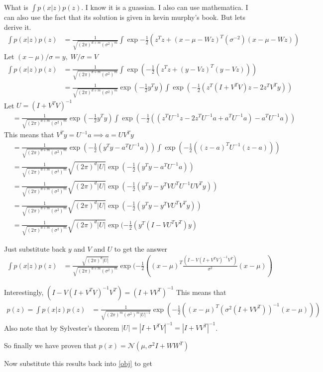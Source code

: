 \documentclass[11pt]{article}
\renewcommand{\det}[1]{|#1|}
\newcommand{\mf}{-\frac{1}{2}}
\newcommand{\fc}{\frac{1}{\sqrt{(2\pi)^{d+m}(\sigma^2)^m }}}
\begin{document}
What is $\int p(x|z) p(z)$. I know it is a guassian. I also can use
mathematica. I can also use the fact that its solution is given in
kevin murphy's book. But lets derive it.
\begin{align}
  \int p(x|z)p(z) &= \fc \int
  \exp{\mf (z^Tz + (x-\mu - Wz)^T(\sigma^{-2})(x-\mu-Wz))}
\end{align}
Let $(x-\mu)/\sigma = y,\; W/\sigma=V$
\begin{align}
  \int p(x|z)p(z) &= \fc \int \exp(\mf (z^Tz + (y - Vz)^T(y-Vz)))\\
  &= \fc\exp(\mf y^Ty) \int \exp(\mf (z^T (I+V^TV) z  - 2z^TV^Ty))
\end{align}
Let $U = (I+V^TV)^{-1}$
\begin{align}
  &= \fc \exp(\mf y^Ty) \int \exp(\mf ( \left(z^TU^{-1}z -2z^TU^{-1}a + a^TU^{-1}a\right) - a^TU^{-1}a  ))
\end{align}
This means that $V^Ty = U^{-1}a \implies a = UV^Ty$
\begin{align}
  &= \fc \exp(\mf (y^Ty - a^TU^{-1}a) ) \int \exp(\mf ((z-a)^T U^{-1}(z-a)))\\
  &= \fc \sqrt{(2\pi)^d \det{U}} \exp(\mf (y^Ty - a^TU^{-1}a) )\\
  &= \fc \sqrt{(2\pi)^d \det{U}} \exp(\mf (y^Ty - y^TVU^TU^{-1}UV^Ty))\\
  &= \fc \sqrt{(2\pi)^d \det{U}} \exp(\mf (y^Ty - y^TVU^TV^Ty) )\\
  &= \fc \sqrt{(2\pi)^d \det{U}} \exp(\mf (y^T(I-VU^TV^T)y)
\end{align}

Just substitute back $y$ and $V$ and $U$ to get the answer
\begin{align}
  \int p(x|z)p(z) &= \frac{\sqrt{(2\pi)^d \det{U}}}{\sqrt{(2\pi)^{d+m}(\sigma^2)^m }} \exp(\mf ((x-\mu)^T\frac{(I-V(I+V^TV)^{-1}V^T)}{\sigma^2}(x-\mu))
\end{align}

Interestingly, $(I-V(I+V^TV)^{-1}V^T) = (I+VV^T)^{-1}$
This means that
\begin{align}
  p(z) = \int p(x|z)p(z) &= \frac{1}{\sqrt{(2\pi)^{m}(\sigma^2)^m \det{U}^{-1}}}  \exp(\mf ((x-\mu)^T (\sigma^2 (I+VV^T))^{-1}  (x-\mu)))
\end{align}
Also note that by Sylvester's theorem $\det{U} = \det{I+V^TV}^{-1} = \det{I+VV^T}^{-1} $.

So finally we have proven that $p(x) = \mathcal{N}(\mu,
\sigma^2I+WW^T)$

Now substitute this results back into \ref{obj} to get
\end{document}

